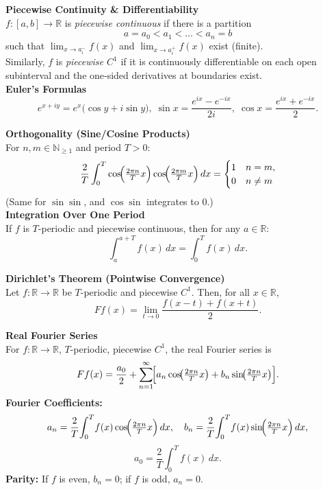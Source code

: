 \documentclass[8pt]{article}
\begin{document}
\let\oldenumerate\enumerate
\def\enumerate{\oldenumerate
  \setlength{\itemsep}{0pt}
  \setlength{\parskip}{0pt}
  \setlength{\parsep}{0pt}
}
\let\olditemize\itemize
\def\itemize{\olditemize
  \setlength{\itemsep}{0pt}
  \setlength{\parskip}{0pt}
  \setlength{\parsep}{0pt}
}
\small
\begin{multicols}{2}

\noindent \textbf{Piecewise Continuity \& Differentiability}\\
$f:[a,b]\to\mathbb{R}$ is \emph{piecewise continuous} if there is a partition
\[
  a=a_0 < a_1 < \dots < a_n = b
\]
such that $\lim_{x \to a_i^-} f(x)$ and $\lim_{x \to a_i^+} f(x)$ exist (finite).\\
Similarly, $f$ is \emph{piecewise $C^1$} if it is continuously differentiable on each open subinterval and the one‐sided derivatives at boundaries exist.\\

\noindent \textbf{Euler's Formulas}
\[
  e^{x+iy} = e^{x}\bigl(\cos y + i \sin y\bigr),\;
  \sin x = \frac{e^{ix}-e^{-ix}}{2i},\;
  \cos x = \frac{e^{ix}+e^{-ix}}{2}.
\]

\noindent \textbf{Orthogonality (Sine/Cosine Products)}\\
For $n,m \in \mathbb{N}_{\ge 1}$ and period $T>0$:
\[
  \frac{2}{T} \int_{0}^{T}
  \cos\!\Bigl(\tfrac{2\pi n}{T}x\Bigr)\cos\!\Bigl(\tfrac{2\pi m}{T}x\Bigr)\,dx
=
\begin{cases}
1 & n=m,\\
0 & n\neq m
\end{cases}
\]
(Same for $\sin\sin$, and $\cos\sin$ integrates to $0$.)\\

\noindent \textbf{Integration Over One Period}\\
If $f$ is $T$-periodic and piecewise continuous, then for any $a\in\mathbb{R}$:
\[
  \int_{a}^{a+T} f(x)\,dx = \int_{0}^{T} f(x)\,dx.
\]

\noindent \textbf{Dirichlet's Theorem (Pointwise Convergence)}\\
Let \( f : \mathbb{R} \to \mathbb{R} \) be \( T \)-periodic and piecewise \( C^1 \). Then, for all \( x \in \mathbb{R} \),
\[
  Ff(x) = \lim_{t \to 0} \frac{f(x - t) + f(x + t)}{2}.
\]

\noindent \textbf{Real Fourier Series}\\
For $f:\mathbb{R}\to\mathbb{R}$, $T$-periodic, piecewise $C^1$, the real Fourier series is
\[
  Ff(x)= \frac{a_{0}}{2}
   + \sum_{n=1}^{\infty}\!\Bigl[a_{n}\cos\!\bigl(\tfrac{2\pi n}{T}x\bigr)
   + b_{n}\sin\!\bigl(\tfrac{2\pi n}{T}x\bigr)\Bigr].
\]
\noindent \textbf{Fourier Coefficients:}
\[
  a_{n} = \frac{2}{T}\!\int_{0}^{T}\!f(x)
          \cos\!\Bigl(\tfrac{2\pi n}{T}x\Bigr)\,dx,\quad
  b_{n} = \frac{2}{T}\!\int_{0}^{T}\!f(x)
          \sin\!\Bigl(\tfrac{2\pi n}{T}x\Bigr)\,dx,
\]
\[
  a_{0} = \frac{2}{T}\int_{0}^{T} f(x)\,dx.
\]
\noindent \textbf{Parity:} If $f$ is even, $b_{n}=0$; if $f$ is odd, $a_{n}=0$.\\


\end{multicols}
\end{document}
